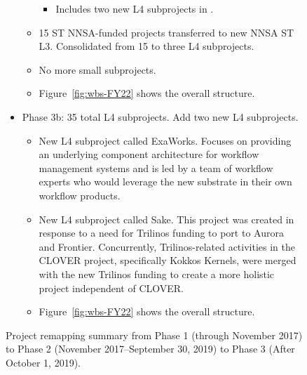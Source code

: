 \begin{figure}
\begin{mdframed}
\begin{itemize}
\begin{itemize}
\begin{itemize}
	\item Includes two new L4 subprojects in \ecosystem.
	\end{itemize}
	\item 15 ST NNSA-funded projects transferred to new NNSA ST L3. Consolidated from 15 to three L4 subprojects.
	\item No more small subprojects.
	\item Figure~\ref{fig:wbs-FY22} shows the overall structure.
\end{itemize}
\item Phase 3b: 35 total L4 subprojects.  Add two new L4 subprojects.
\begin{itemize}
	\item New L4 subproject called ExaWorks.  Focuses on providing an underlying component architecture for workflow management systems and is led by a team of workflow experts who would leverage the new substrate in their own workflow products.
	\item New L4 subproject called Sake.  This project was created in response to a need for Trilinos funding to port to Aurora and Frontier.  Concurrently, Trilinos-related activities in the CLOVER project, specifically Kokkos Kernels, were merged with the new Trilinos funding to create a more holistic project independent of CLOVER.
	\item Figure~\ref{fig:wbs-FY22} shows the overall structure.
\end{itemize}
\end{itemize}
\end{mdframed}

\caption{\label{fig:project-remapping}Project remapping summary from Phase 1 (through November 2017) to Phase 2 (November 2017--September 30, 2019) to Phase 3 (After October 1, 2019).}
\end{figure}


